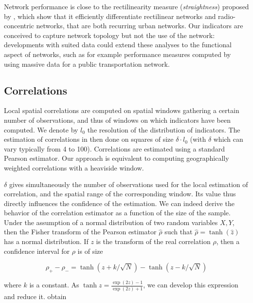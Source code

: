 Network performance is close to the rectilinearity measure (\emph{straightness}) proposed by \cite{josselin2016straightness}, which show that it efficiently differentiate rectilinear networks and radio-concentric networks, that are both recurring urban networks. Our indicators are conceived to capture network topology but not the use of the network: developments with suited data could extend these analyses to the functional aspect of networks, such as for example performance measures computed by~\cite{trepanier2009calculation} using massive data for a public transportation network.



\subsection{Correlations}

Local spatial correlations are computed on spatial windows gathering a certain number of observations, and thus of windows on which indicators have been computed. We denote by $l_0$ the resolution of the distribution of indicators. The estimation of correlations in then done on squares of size $\delta\cdot l_0$ (with $\delta$ which can vary typically from 4 to 100). Correlations are estimated using a standard Pearson estimator. Our approach is equivalent to computing geographically weighted correlations \citep{brunsdon2002geographically} with a heaviside window.

$\delta$ gives simultaneously the number of observations used for the local estimation of correlation, and the spatial range of the corresponding window. Its value thus directly influences the confidence of the estimation. We can indeed derive the behavior of the correlation estimator as a function of the size of the sample. Under the assumption of a normal distribution of two random variables $X,Y$, then the Fisher transform of the Pearson estimator $\hat{\rho}$ such that $\hat{\rho} = \tanh (\hat{z})$ has a normal distribution. If $z$ is the transform of the real correlation $\rho$, then a confidence interval for $\rho$ is of size

\begin{equation}
\rho_{+} - \rho_{-} = \tanh (z + k / \sqrt{N}) - \tanh (z - k / \sqrt{N})
\end{equation}

where $k$ is a constant. As $\tanh{z} = \frac{\exp (2z) - 1}{\exp (2z) + 1}$, we can develop this expression and reduce it.  obtain


